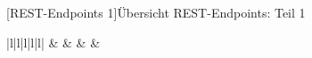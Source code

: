 [REST-Endpoints 1]{Übersicht REST-Endpoints: Teil 1}
\label{table:endpoints1}
\begin{table}
	\centering
	\begin{tabular}{|l|l|l|l|l|}
		\hline
		 &                                                   &                                                                   &  &                                                                           \\ \hline
		

\end{tabular}
\end{table}
